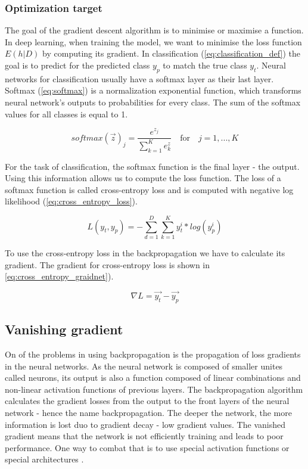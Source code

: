 \documentclass[times, utf8, diplomski]{fer}
\begin{document}
\subsubsection{Optimization target}

The goal of the gradient descent algorithm is to minimise or maximise a function. In deep learning, when training the model, we want to minimise the loss function $E(h|D)$ by computing its gradient. In classification (\ref{eq:classification_def}) the goal is to predict for the predicted class $y_p$ to match the true class $y_t$. Neural networks for classification usually have a softmax layer as their last layer. Softmax (\ref{eq:softmax}) is a normalization exponential function, which transforms neural network's outputs to probabilities for every class. The sum of the softmax values for all classes is equal to 1.  

\begin{equation}
\label{eq:softmax}
	softmax(\vec{z})_j = \frac{e^{z_j}}{\displaystyle\sum_{k=1}^{K} e^{z}_k} \quad \text{for} \quad j = 1, ..., K
\end{equation} 

For the task of classification, the softmax function is the final layer - the output. Using this information allows us to compute the loss function. The loss of a softmax function is called cross-entropy loss and is computed with negative log likelihood (\ref{eq:cross_entropy_loss}).

\begin{equation}
\label{eq:cross_entropy_loss}
	L(y_t, y_p) = - \displaystyle\sum_{d=1}^{D} \sum_{k=1}^{K} y^i_t * log(y^i_p) 
\end{equation}

To use the cross-entropy loss in the backpropagation we have to calculate its gradient. The gradient for cross-entropy loss is shown in \ref{eq:cross_entropy_graidnet}).

\begin{equation}
\label{eq:cross_entropy_graidnet}
 \nabla{L} = \vec{y_t} - \vec{y_p}
\end{equation}

\subsection{Vanishing gradient}
\label{se:vanishing_gradient}

On of the problems in using backpropagation is the propagation of loss gradients in the neural networks. As the neural network is composed of smaller unites called neurons, its output is also a function composed of linear combinations and non-linear activation functions of previous layers. The backpropagation algorithm calculates the gradient losses from the output to the front layers of the neural network - hence the name backpropagation. The deeper the network, the more information is lost duo to gradient decay - low gradient values. The vanished gradient means that the network is not efficiently training and leads to poor performance. One way to combat that is to use special activation functions \citep{clevert_fast_2015, xu_empirical_2015, he_delving_2015} or special architectures \citep{he_deep_2016}. 
\end{document}
